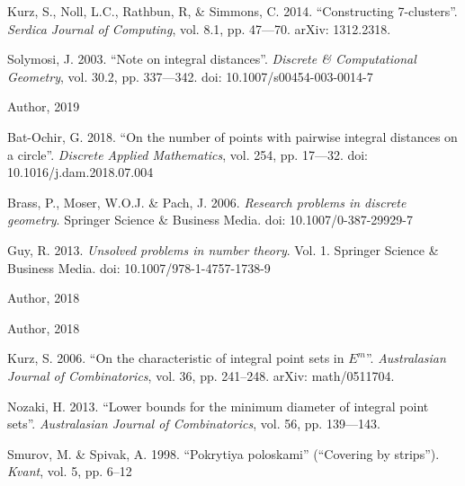 \begin{engbibliography}{99}
	Kurz, S., Noll, L.C., Rathbun, R, \& Simmons, C. 2014.
	“Constructing 7-clusters”.
	\emph{Serdica Journal of Computing}, vol. 8.1, pp. 47—70. arXiv: 1312.2318.

	Solymosi, J. 2003.
	“Note on integral distances”.
	\emph{Discrete \& Computational Geometry}, vol. 30.2, pp. 337—342.
	doi: 10.1007/s00454-003-0014-7

	Author, 2019

	Bat-Ochir, G. 2018.
	“On the number of points with pairwise integral distances on a circle”.
	\emph{Discrete Applied Mathematics}, vol. 254, pp. 17—32.
	doi: 10.1016/j.dam.2018.07.004

	Brass, P., Moser, W.O.J. \& Pach, J. 2006.
	\emph{Research problems in discrete geometry}. Springer Science \& Business Media.
	doi: 10.1007/0-387-29929-7

	Guy, R. 2013.
	\emph{Unsolved problems in number theory}. Vol. 1.
	Springer Science \& Business Media.
	doi: 10.1007/978-1-4757-1738-9

	Author, 2018

	Author, 2018

	Kurz, S. 2006.
	“On the characteristic of integral point sets in $E^m$”.
	\emph{Australasian Journal of Combinatorics}, vol. 36, pp. 241–248.
	arXiv: math/0511704.

	Nozaki, H. 2013.
	“Lower bounds for the minimum diameter of integral point sets”.
	\emph{Australasian Journal of Combinatorics}, vol. 56, pp. 139—143.

	Smurov, M. \& Spivak, A. 1998.
	“Pokrytiya poloskami” (``Covering by strips'').
	\emph{Kvant}, vol. 5, pp. 6--12

\end{engbibliography}
